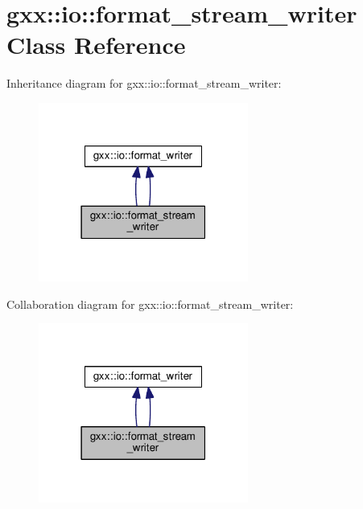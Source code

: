 \hypertarget{classgxx_1_1io_1_1format__stream__writer}{}\section{gxx\+:\+:io\+:\+:format\+\_\+stream\+\_\+writer Class Reference}
\label{classgxx_1_1io_1_1format__stream__writer}


Inheritance diagram for gxx\+:\+:io\+:\+:format\+\_\+stream\+\_\+writer\+:
\nopagebreak
\begin{figure}[H]
\begin{center}
\leavevmode
\includegraphics[width=195pt]{classgxx_1_1io_1_1format__stream__writer__inherit__graph}
\end{center}
\end{figure}


Collaboration diagram for gxx\+:\+:io\+:\+:format\+\_\+stream\+\_\+writer\+:
\nopagebreak
\begin{figure}[H]
\begin{center}
\leavevmode
\includegraphics[width=195pt]{classgxx_1_1io_1_1format__stream__writer__coll__graph}
\end{center}
\end{figure}

